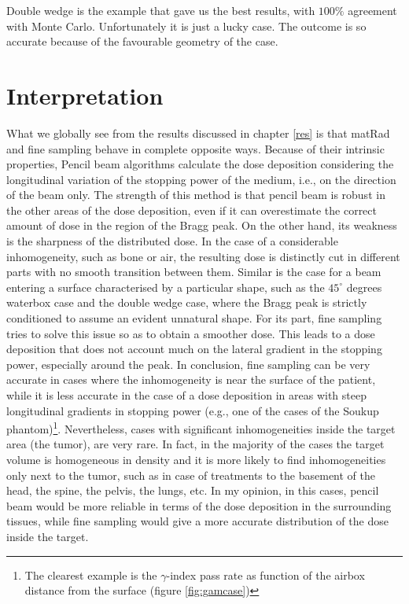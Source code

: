 \documentclass[12pt, a4paper, twoside]{book}
\begin{document}
Double wedge is the example that gave us the best results, with $100\%$ agreement with Monte Carlo. Unfortunately it is just a lucky case. The outcome is so accurate because of the favourable geometry of the case. 


\section{Interpretation}
What we globally see from the results discussed in chapter \ref{res} is that matRad and fine sampling behave in complete opposite ways. Because of their intrinsic properties, Pencil beam algorithms calculate the dose deposition considering the longitudinal variation of the stopping power of the medium, i.e., on the direction of the beam only. The strength of this method is that pencil beam is robust in the other areas of the dose deposition, even if it can overestimate the correct amount of dose in the region of the Bragg peak. On the other hand, its weakness is the sharpness of the distributed dose. In the case of a considerable inhomogeneity, such as bone or air, the resulting dose is distinctly cut in different parts with no smooth transition between them. Similar is the case for a beam entering a surface characterised by a particular shape, such as the $45^\circ$ degrees waterbox case and the double wedge case, where the Bragg peak is strictly conditioned to assume an evident unnatural shape.
For its part, fine sampling tries to solve this issue so as to obtain a smoother dose. This leads to a dose deposition that does not account much on the lateral gradient in the stopping power, especially around the peak.
In conclusion, fine sampling can be very accurate in cases where the inhomogeneity is near the surface of the patient, while it is less accurate in the case of a dose deposition in areas with steep longitudinal gradients in stopping power (e.g., one of the cases of the Soukup phantom)\footnote{The clearest example is the $\gamma$-index pass rate as function of the airbox distance from the surface (figure \ref{fig:gamcase})}. Nevertheless, cases with significant inhomogeneities inside the target area (the tumor), are very rare. In fact, in the majority of the cases the target volume is homogeneous in density and it is more likely to find inhomogeneities only next to the tumor, such as in case of treatments to the basement of the head, the spine, the pelvis, the lungs, etc. In my opinion, in this cases, pencil beam would be more reliable in terms of the dose deposition in the surrounding tissues, while fine sampling would give a more accurate distribution of the dose inside the target.
\end{document}
